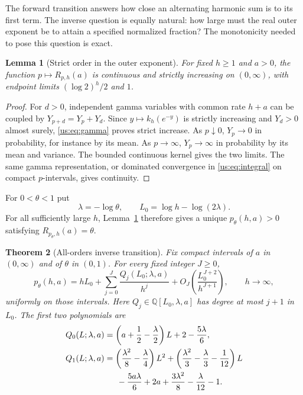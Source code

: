 \documentclass[11pt,a4paper]{article}
\numberwithin{equation}{section}
\theoremstyle{plain}
\newtheorem{theorem}{Theorem}[section]
\newtheorem{lemma}[theorem]{Lemma}
\theoremstyle{definition}
\theoremstyle{remark}
\begin{document}
The forward transition answers how close an alternating harmonic sum
is to its first term. The inverse question is equally natural: how
large must the real outer exponent be to attain a specified normalized
fraction? The monotonicity needed to pose this question is exact.

\begin{lemma}[Strict order in the outer exponent]
\label{us:lem:monotone}
For fixed $h\ge1$ and $a>0$, the function $p\mapsto R_{p,h}(a)$
is continuous and strictly increasing on $(0,\infty)$, with endpoint
limits $(\log2)^h/2$ and $1$.
\end{lemma}
\begin{proof}
For $d>0$, independent gamma variables with common rate $h+a$
can be coupled by $Y_{p+d}=Y_p+Y_d$. Since
$y\mapsto k_h(e^{-y})$ is strictly increasing and $Y_d>0$
almost surely, \eqref{us:eq:gamma} proves strict increase.
As $p\downarrow0$, $Y_p\to0$ in probability, for instance by its
mean. As $p\to\infty$, $Y_p\to\infty$ in probability by its
mean and variance. The bounded continuous kernel gives the two
limits. The same gamma representation, or dominated convergence
in \eqref{us:eq:integral} on compact $p$-intervals, gives continuity.
\end{proof}

For $0<\theta<1$ put
\begin{equation}\label{us:eq:inverse-parameters}
 \lambda=-\log\theta,
 \qquad L_0=\log h-\log(2\lambda).
\end{equation}
For all sufficiently large $h$, Lemma~\ref{us:lem:monotone}
therefore gives a unique $p_\theta(h,a)>0$ satisfying
$R_{p_\theta,h}(a)=\theta$.

\begin{theorem}[All-orders inverse transition]
\label{us:thm:inverse}
Fix compact intervals of $a$ in $(0,\infty)$ and of $\theta$
in $(0,1)$. For every fixed integer $J\ge0$,
\begin{equation}\label{us:eq:inverse-all}
 p_\theta(h,a)=hL_0+
   \sum_{j=0}^J\frac{Q_j(L_0;\lambda,a)}{h^j}
   +O_J\!\left(\frac{L_0^{J+2}}{h^{J+1}}\right),
 \qquad h\to\infty,
\end{equation}
uniformly on those intervals. Here $Q_j\in\mathbb Q[L_0,\lambda,a]$
has degree at most $j+1$ in $L_0$. The first two polynomials are
\begin{align}
 Q_0(L;\lambda,a)
  & =\left(a+\frac12-\frac\lambda2\right)L
       +2-\frac{5\lambda}{6},\label{us:eq:Q0}\\
 Q_1(L;\lambda,a)
  & =\left(\frac{\lambda^2}{8}-\frac\lambda4\right)L^2
    +\left(\frac{\lambda^2}{3}-\frac\lambda3-\frac1{12}\right)L
       \notag\\
  &\hspace{1.5em}-\frac{5a\lambda}{6}+2a
       +\frac{3\lambda^2}{8}-\frac\lambda{12}-1.
       \label{us:eq:Q1}
\end{align}
\end{theorem}
\end{document}
